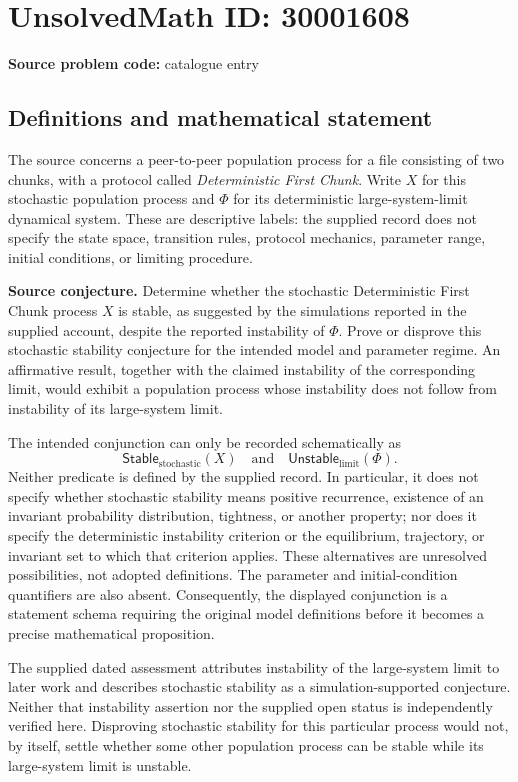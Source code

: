 \documentclass[11pt]{article}
\begin{document}
\section*{UnsolvedMath ID: 30001608}
\textbf{Source problem code:} catalogue entry
\subsection{Definitions and mathematical statement}
The source concerns a peer-to-peer population process for a file consisting of two chunks, with a protocol called \emph{Deterministic First Chunk}. Write \(X\) for this stochastic population process and \(\Phi\) for its deterministic large-system-limit dynamical system. These are descriptive labels: the supplied record does not specify the state space, transition rules, protocol mechanics, parameter range, initial conditions, or limiting procedure.

\textbf{Source conjecture.} Determine whether the stochastic Deterministic First Chunk process \(X\) is stable, as suggested by the simulations reported in the supplied account, despite the reported instability of \(\Phi\). Prove or disprove this stochastic stability conjecture for the intended model and parameter regime. An affirmative result, together with the claimed instability of the corresponding limit, would exhibit a population process whose instability does not follow from instability of its large-system limit.

The intended conjunction can only be recorded schematically as
\[
\mathsf{Stable}_{\mathrm{stochastic}}(X)
\quad\text{and}\quad
\mathsf{Unstable}_{\mathrm{limit}}(\Phi).
\]
Neither predicate is defined by the supplied record. In particular, it does not specify whether stochastic stability means positive recurrence, existence of an invariant probability distribution, tightness, or another property; nor does it specify the deterministic instability criterion or the equilibrium, trajectory, or invariant set to which that criterion applies. These alternatives are unresolved possibilities, not adopted definitions. The parameter and initial-condition quantifiers are also absent. Consequently, the displayed conjunction is a statement schema requiring the original model definitions before it becomes a precise mathematical proposition.

The supplied dated assessment attributes instability of the large-system limit to later work and describes stochastic stability as a simulation-supported conjecture. Neither that instability assertion nor the supplied open status is independently verified here. Disproving stochastic stability for this particular process would not, by itself, settle whether some other population process can be stable while its large-system limit is unstable.
\end{document}
